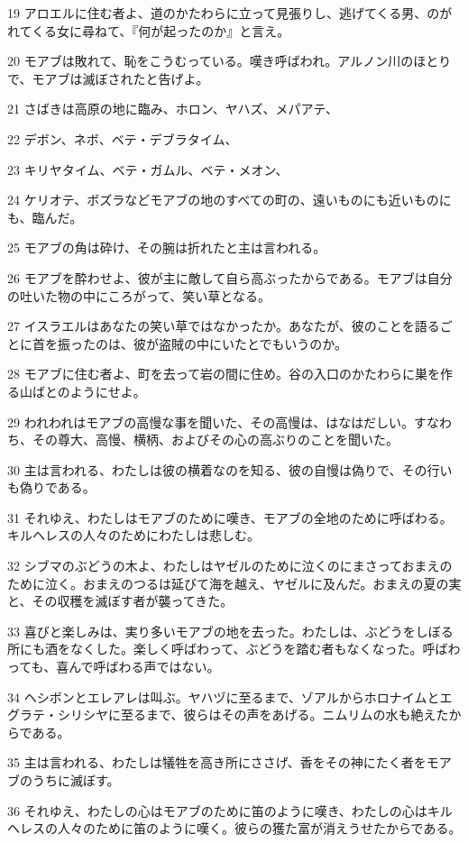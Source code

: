 \par 19 アロエルに住む者よ、道のかたわらに立って見張りし、逃げてくる男、のがれてくる女に尋ねて、『何が起ったのか』と言え。
\par 20 モアブは敗れて、恥をこうむっている。嘆き呼ばわれ。アルノン川のほとりで、モアブは滅ぼされたと告げよ。
\par 21 さばきは高原の地に臨み、ホロン、ヤハズ、メパアテ、
\par 22 デボン、ネボ、ベテ・デブラタイム、
\par 23 キリヤタイム、ベテ・ガムル、ベテ・メオン、
\par 24 ケリオテ、ボズラなどモアブの地のすべての町の、遠いものにも近いものにも、臨んだ。
\par 25 モアブの角は砕け、その腕は折れたと主は言われる。
\par 26 モアブを酔わせよ、彼が主に敵して自ら高ぶったからである。モアブは自分の吐いた物の中にころがって、笑い草となる。
\par 27 イスラエルはあなたの笑い草ではなかったか。あなたが、彼のことを語るごとに首を振ったのは、彼が盗賊の中にいたとでもいうのか。
\par 28 モアブに住む者よ、町を去って岩の間に住め。谷の入口のかたわらに巣を作る山ばとのようにせよ。
\par 29 われわれはモアブの高慢な事を聞いた、その高慢は、はなはだしい。すなわち、その尊大、高慢、横柄、およびその心の高ぶりのことを聞いた。
\par 30 主は言われる、わたしは彼の横着なのを知る、彼の自慢は偽りで、その行いも偽りである。
\par 31 それゆえ、わたしはモアブのために嘆き、モアブの全地のために呼ばわる。キルヘレスの人々のためにわたしは悲しむ。
\par 32 シブマのぶどうの木よ、わたしはヤゼルのために泣くのにまさっておまえのために泣く。おまえのつるは延びて海を越え、ヤゼルに及んだ。おまえの夏の実と、その収穫を滅ぼす者が襲ってきた。
\par 33 喜びと楽しみは、実り多いモアブの地を去った。わたしは、ぶどうをしぼる所にも酒をなくした。楽しく呼ばわって、ぶどうを踏む者もなくなった。呼ばわっても、喜んで呼ばわる声ではない。
\par 34 ヘシボンとエレアレは叫ぶ。ヤハヅに至るまで、ゾアルからホロナイムとエグラテ・シリシヤに至るまで、彼らはその声をあげる。ニムリムの水も絶えたからである。
\par 35 主は言われる、わたしは犠牲を高き所にささげ、香をその神にたく者をモアブのうちに滅ぼす。
\par 36 それゆえ、わたしの心はモアブのために笛のように嘆き、わたしの心はキルヘレスの人々のために笛のように嘆く。彼らの獲た富が消えうせたからである。
